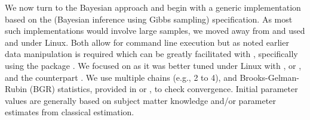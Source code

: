 \documentclass[article]{jss}
\begin{document}
We now turn to the Bayesian approach and begin with a generic
implementation based on the  (Bayesian inference using
Gibbs sampling) specification. As most such implementations would
involve large samples, we moved away from  \citep{lunn00}
and used  \citep{OpenBUGS} and  under
Linux. Both allow for command line execution but as noted earlier
\citep{R2WinBUGS} data manipulation is required which can be greatly
facilitated with , specifically using the 
package  \citep{R2WinBUGS}. We focused on 
as it was better tuned under Linux with 
\citep{anderson99}, or , \citep{MKL} and the
 counterpart  \citep{R2jags}. We use multiple
chains (e.g., 2 to 4), and Brooks-Gelman-Rubin (BGR) statistics,
provided in  or , to check
convergence. Initial parameter values are generally based on subject
matter knowledge and/or parameter estimates from classical estimation.
\end{document}
